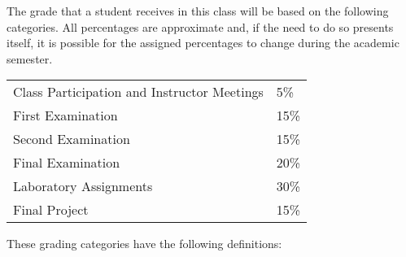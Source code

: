 The grade that a student receives in this class will be based on the following categories. All percentages are
approximate and, if the need to do so presents itself, it is possible for the assigned percentages to change during the
academic semester. 

\begin{center}
  \begin{tabular}{ll}
    Class Participation and Instructor Meetings & 5\% \\
    First Examination & 15\% \\
    Second Examination & 15\% \\
    Final Examination & 20\% \\
    Laboratory Assignments & 30\% \\
    Final Project & 15\%
  \end{tabular}
\end{center}

\vspace*{-.1in}
\noindent
These grading categories have the following definitions:
\vspace*{-.1in}

